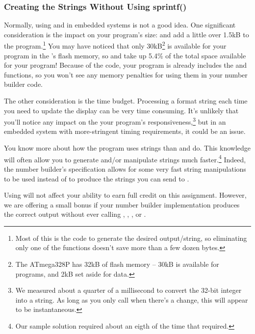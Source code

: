 \subsubsection{Creating the Strings Without Using sprintf()}

Normally, using  and  in embedded systems is not a good idea.
One significant consideration is the impact on your program's size:  and  add a little over 1.5kB to the program.\footnote{
    Most of this is the code to generate the desired output/string, so eliminating only one of the functions doesn't save more than a few dozen bytes.
}
You may have noticed that only 30kB\footnote{
    The ATmega328P has 32kB of flash memory  -- 30kB is available for programs, and 2kB set aside for data.
} is available for your program in the \developmentboard's flash memory, so  and  take up 5.4\% of the total space available for your program!
Because of the  code, your program is already includes the  and  functions, so you won't see any memory penalties for using them in your number builder code.

The other consideration is the time budget.
Processing a format string each time you need to update the display can be very time consuming.
It's unlikely that you'll notice any impact on the your program's responsiveness,\footnote{
    We measured  about a quarter of a millisecond to convert the 32-bit integer into a string.
    As long as you only call  when there's a change, this will appear to be instantaneous.
} but in an embedded system with more-stringent timing requirements, it could be an issue.

You know more about how the program uses strings than  and  do.
This knowledge will often allow you to generate and/or manipulate strings much faster.\footnote{
    Our sample solution required about an eigth of the time that  required.
} Indeed, the number builder's specification allows for some very fast string manipulations to be used instead of  to produce the strings you can send to .

Using  will not affect your ability to earn full credit on this assignment.
However, we are offering a small bonus if your number builder implementation produces the correct output without ever calling , , , or .


